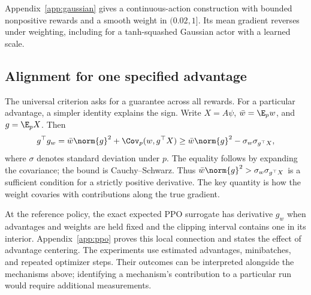 Appendix~\ref{app:gaussian} gives a continuous-action construction with bounded nonpositive rewards and a smooth weight in $(0.02,1]$. Its mean gradient reverses under weighting, including for a tanh-squashed Gaussian actor with a learned scale.

\subsection{Alignment for one specified advantage}

The universal criterion asks for a guarantee across all rewards. For a particular advantage, a simpler identity explains the sign. Write $X=A\psi$, $\bar w=\E_p w$, and $g=\E_pX$. Then
\begin{equation}
g^\top g_w=\bar w\norm{g}^2+\Cov_p(w,g^\top X)
\ge\bar w\norm{g}^2-\sigma_w\sigma_{g^\top X},
\label{eq:covariance-alignment}
\end{equation}
where $\sigma$ denotes standard deviation under $p$. The equality follows by expanding the covariance; the bound is Cauchy--Schwarz. Thus $\bar w\norm{g}^2>\sigma_w\sigma_{g^\top X}$ is a sufficient condition for a strictly positive derivative. The key quantity is how the weight covaries with contributions along the true gradient.

At the reference policy, the exact expected PPO surrogate has derivative $g_w$ when advantages and weights are held fixed and the clipping interval contains one in its interior. Appendix~\ref{app:ppo} proves this local connection and states the effect of advantage centering. The experiments use estimated advantages, minibatches, and repeated optimizer steps. Their outcomes can be interpreted alongside the mechanisms above; identifying a mechanism's contribution to a particular run would require additional measurements.
